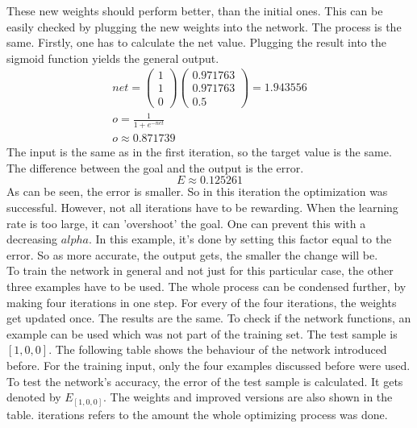 \documentclass[12pt]{article}
\def\alpha{alpha}%
\begin{document}
These new weights should perform better, than the initial ones. This can be easily checked by plugging the new weights into the network. The process is the same. Firstly, one has to calculate the net value. Plugging the result into the sigmoid function yields the general output.
\begin{equation}\nonumber
    \begin{gathered}
    net = \begin{pmatrix}1\\ 1\\ 0\end{pmatrix}\begin{pmatrix} 0.971763\\  0.971763\\ 0.5\end{pmatrix} = 1.943556\\
    o = \frac{1}{1+e^{-net}}\\
    o \approx 0.871739
    \end{gathered}
\end{equation}
The input is the same as in the first \gls{iteration}, so the target value is the same. The difference between the goal and the output is the error.
\begin{equation}\nonumber
    E \approx 0.125261
\end{equation}
As can be seen, the error is smaller. So in this \gls{iteration} the optimization was successful. However, not all \glspl{iteration} have to be rewarding. When the \gls{learning rate} is too large, it can 'overshoot' the goal. One can prevent this with a decreasing $\alpha$. In this example, it's done by setting this factor equal to the error. So as more accurate, the output gets, the smaller the change will be. \\To train the network in general and not just for this particular case, the other three examples have to be used. The whole process can be condensed further, by making four \glspl{iteration} in one step. For every of the four \glspl{iteration}, the \glspl{weight} get updated once. The results are the same. 
To check if the network functions, an example can be used which was not part of the training set. The test sample is $ \left [ 1,0,0 \right ] $. The following table shows the behaviour of the network introduced before. For the training input, only the four examples discussed before were used. To test the network's accuracy, the error of the test sample is calculated. It gets denoted by $ E_{[1,0,0]} $. The weights and improved versions are also shown in the table. \Glspl{iteration} refers to the amount the whole optimizing process was done.
\end{document}
